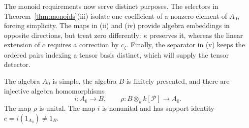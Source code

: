 The monoid requirements now serve distinct purposes. The selectors
in Theorem~\ref{thm:monoids}(iii) isolate one coefficient of a nonzero
element of \(A_0\), forcing simplicity. The maps in (ii) and (iv)
provide algebra embeddings in opposite directions, but treat zero
differently: \(\kappa\) preserves it, whereas the linear extension
of \(c\) requires a correction by \(c_{\zeta}\). Finally, the
separator in (v) keeps the ordered pairs indexing a tensor basis
distinct, which will supply the tensor detector.

\begin{lemma}\label{lem:algebra-embeddings}
The algebra \(A_0\) is simple, the algebra \(B\) is finitely presented,
and there are injective algebra homomorphisms
\[
 i:A_0\longrightarrow B,
 \qquad
 \rho:B\otimes_k k[\mathcal P]\longrightarrow A_0.
\]
The map \(\rho\) is unital.  The map \(i\) is nonunital and has support identity
\(e=i(1_{A_0})\ne1_B\).
\end{lemma}

